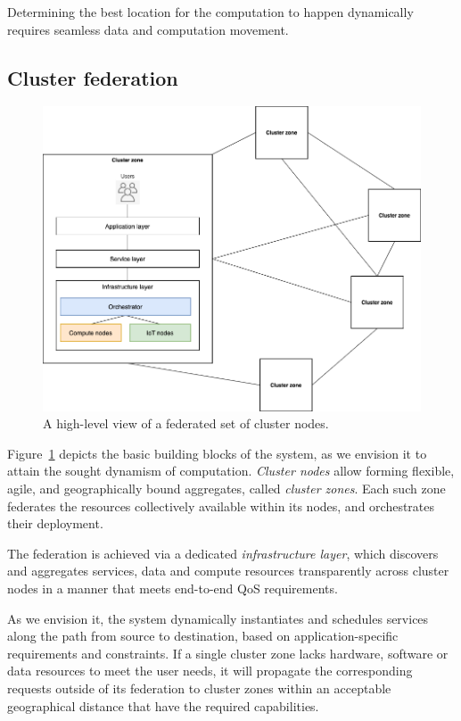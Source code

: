 Determining the best location for the computation to happen dynamically requires seamless data and computation movement. %

\subsection{Cluster federation}

\begin{figure}[ht]
\centering
\includegraphics[width=0.75\columnwidth]{figures/architecture-federation}
\caption{A high-level view of a federated set of cluster nodes.} \label{fig:architecture-federation}
\end{figure}

Figure~\ref{fig:architecture-federation} depicts
the basic building blocks of the system, as we envision it to attain the sought dynamism of computation.  
\textit{Cluster nodes} allow forming flexible, agile, and geographically bound aggregates, called \textit{cluster zones}.
Each such zone federates the resources collectively available within its nodes, and orchestrates their deployment. 

The federation is achieved via a dedicated \textit{infrastructure layer}, which discovers and aggregates services, data and compute resources transparently across cluster nodes in a manner that meets end-to-end QoS requirements.

As we envision it, the system dynamically instantiates and schedules services along the path from source to destination, based on application-specific requirements and constraints. 
If a single cluster zone lacks hardware, software or data resources to meet the user needs, it will propagate the corresponding requests outside of its federation to cluster zones within an acceptable geographical distance that have the required capabilities.

